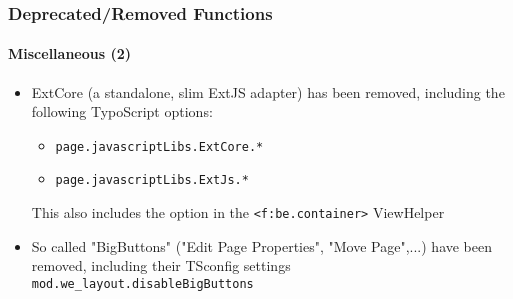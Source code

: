 \begin{frame}[fragile]
	\frametitle{Deprecated/Removed Functions}
	\framesubtitle{Miscellaneous (2)}

	\begin{itemize}

		\item ExtCore (a standalone, slim ExtJS adapter) has been removed, including the following TypoScript options:

			\begin{itemize}
				\item \texttt{page.javascriptLibs.ExtCore.*}
				\item \texttt{page.javascriptLibs.ExtJs.*}
			\end{itemize}

			This also includes the option in the \texttt{<f:be.container>} ViewHelper

		\item So called "BigButtons" ("Edit Page Properties", "Move Page",...) have been removed,
			including their TSconfig settings \texttt{mod.we\_layout.disableBigButtons}

	\end{itemize}

\end{frame}



